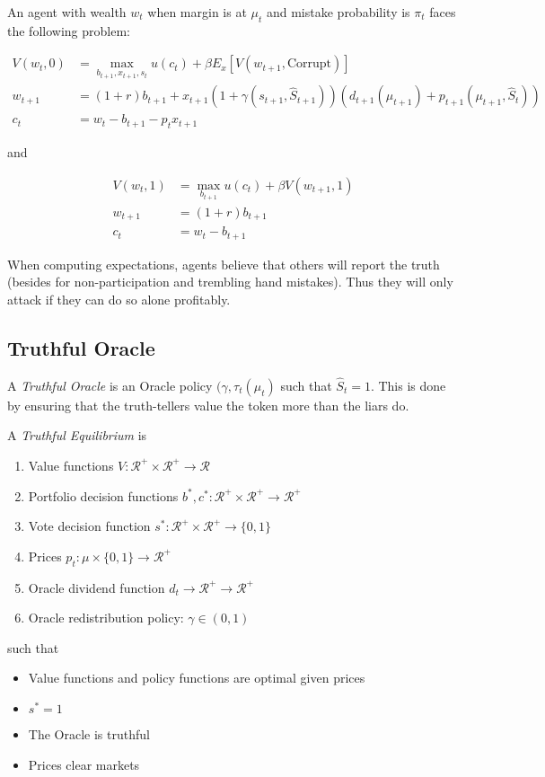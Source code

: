\documentclass[12pt]{article}
\begin{document}
  An agent with wealth $w_t$ when margin is at $\mu_t$ and mistake probability is $\pi_t$ faces the
  following problem:

  \begin{align}
    V(w_t, 0) &= \max_{b_{t+1}, x_{t+1}, s_{t}} u(c_t) + \beta E_x \left[ V(w_{t+1}, \text{Corrupt}) \right] \\
    w_{t+1} &= (1 + r) b_{t+1} + x_{t+1} (1 + \gamma(s_{t+1}, \hat{S}_{t+1})) (d_{t+1}(\mu_{t+1}) + p_{t+1}(\mu_{t+1}, \hat{S}_t)) \\
    c_t &= w_t - b_{t+1} - p_t x_{t+1}
  \end{align}

  and

  \begin{align*}
    V(w_t, 1) &= \max_{b_{t+1}} u(c_t) + \beta V(w_{t+1}, 1) \\
    w_{t+1} &= (1 + r) b_{t+1} \\
    c_t &= w_t - b_{t+1}
  \end{align*}

  When computing expectations, agents believe that others will report the truth (besides for
  non-participation and trembling hand mistakes). Thus they will only attack if they can do so alone
  profitably.

\subsection{Truthful Oracle}

  A \textit{Truthful Oracle} is an Oracle policy $(\gamma, \tau_t(\mu_t)$ such that $\hat{S}_t = 1$. This is done
  by ensuring that the truth-tellers value the token more than the liars do.

  A \textit{Truthful Equilibrium} is

  \begin{enumerate}
    \item Value functions $V : \mathcal{R}^+ \times \mathcal{R}^+ \rightarrow \mathcal{R}$
    \item Portfolio decision functions $b^*, c^* : \mathcal{R}^+ \times \mathcal{R}^+ \rightarrow \mathcal{R}^{+}$
    \item Vote decision function $s^*: \mathcal{R}^+ \times \mathcal{R}^+ \rightarrow \{0, 1 \}$
    \item Prices $p_t : \mu \times \{0, 1\} \rightarrow \mathcal{R}^{+}$
    \item Oracle dividend function $d_t \rightarrow \mathcal{R}^{+} \rightarrow \mathcal{R}^+$
    \item Oracle redistribution policy: $\gamma \in (0, 1)$
  \end{enumerate}

  such that

  \begin{itemize}
    \item Value functions and policy functions are optimal given prices
    \item $s^* = 1$
    \item The Oracle is truthful
    \item Prices clear markets
  \end{itemize}
\end{document}
